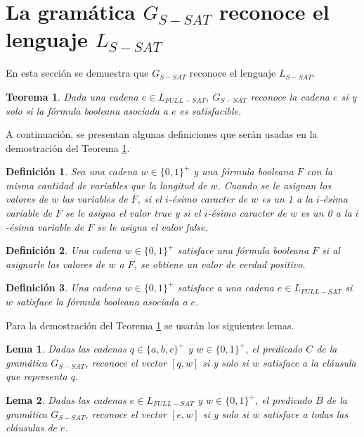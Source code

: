 \documentclass[12pt]{article}
\newtheorem{theorem}{Teorema}
\newtheorem{lemma}{Lema}
\newtheorem{definition}{Definición}
\newcommand{\true}{\textit{true}}
\newcommand{\false}{\textit{false}}
\begin{document}
\section{La gramática $G_{S-SAT}$ reconoce el lenguaje $L_{S-SAT}$}

En esta sección se demuestra que $G_{S-SAT}$ reconoce el lenguaje $L_{S-SAT}$.
\begin{theorem}
    \label{teo:gsat}
    Dada una cadena $e\in L_{FULL-SAT}$, $G_{S-SAT}$ reconoce la cadena $e$ si y solo si la fórmula booleana asociada a $e$ es satisfacible. 
\end{theorem}

A continuación, se presentan algunas definiciones que serán usadas en la demostración del Teorema \ref{teo:gsat}.

\begin{definition}
    Sea una cadena $w\in \{0,1\}^+$ y una fórmula booleana $F$ con la misma cantidad de variables que la longitud de 
    $w$. Cuando se le asignan los valores de $w$ las variables de $F$, si el $i$-ésimo caracter de $w$ es un 1 a la $i$-ésima variable de $F$ se le asigna
    el valor \true{} y si el $i$-ésimo caracter de $w$ es un 0 a la $i$-ésima variable de $F$ se le asigna
    el valor \false{}.
\end{definition}

\begin{definition}
    Una cadena  $w\in\{0,1\}^+$ satisface una fórmula booleana $F$ si al asignarle los valores de $w$ a $F$, se obtiene un valor de verdad positivo.
\end{definition}

\begin{definition}
    Una cadena $w\in\{0,1\}^+$ satisface a una cadena $e\in L_{FULL-SAT}$ si $w$ satisface la fórmula booleana asociada a $e$. 
\end{definition}

Para la demostración del Teorema \ref{teo:gsat} se usarán los siguientes lemas.

\begin{lemma}
    \label{lem:predc}
    Dadas las cadenas $q\in \{a,b,c\}^+$ y $w\in \{0,1\}^+$, el predicado $C$ de la gramática $G_{S-SAT}$, reconoce el vector $[q,w]$ si y solo si $w$ satisface a la cláusula que representa $q$.
\end{lemma}

\begin{lemma}
    \label{lem:predb}
    Dadas las cadenas $e\in L_{FULL-SAT}$ y $w\in \{0,1\}^+$, el predicado $B$ de la gramática $G_{S-SAT}$, reconoce el vector $[e,w]$  si y solo si $w$ satisface a todas las cláusulas de $e$.
\end{lemma}
\end{document}
